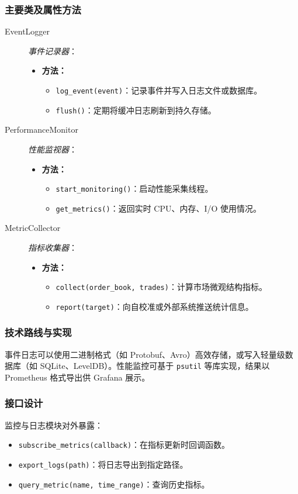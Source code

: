 \subsubsection{主要类及属性方法}
\begin{description}
  \item[EventLogger] \emph{事件记录器}：
  \begin{itemize}
    \item \textbf{方法：}
      \begin{itemize}
        \item \verb|log_event(event)|：记录事件并写入日志文件或数据库。
        \item \verb|flush()|：定期将缓冲日志刷新到持久存储。
      \end{itemize}
  \end{itemize}
  \item[PerformanceMonitor] \emph{性能监视器}：
  \begin{itemize}
    \item \textbf{方法：}
      \begin{itemize}
        \item \verb|start_monitoring()|：启动性能采集线程。
        \item \verb|get_metrics()|：返回实时 CPU、内存、I/O 使用情况。
      \end{itemize}
  \end{itemize}
  \item[MetricCollector] \emph{指标收集器}：
  \begin{itemize}
    \item \textbf{方法：}
      \begin{itemize}
        \item \verb|collect(order_book, trades)|：计算市场微观结构指标。
        \item \verb|report(target)|：向自校准或外部系统推送统计信息。
      \end{itemize}
  \end{itemize}
\end{description}

\subsubsection{技术路线与实现}
事件日志可以使用二进制格式（如 Protobuf、Avro）高效存储，或写入轻量级数据库（如 SQLite、LevelDB）。性能监控可基于 \verb|psutil| 等库实现，结果以 Prometheus 格式导出供 Grafana 展示。

\subsubsection{接口设计}
监控与日志模块对外暴露：
\begin{itemize}
  \item \verb|subscribe_metrics(callback)|：在指标更新时回调函数。
  \item \verb|export_logs(path)|：将日志导出到指定路径。
  \item \verb|query_metric(name, time_range)|：查询历史指标。
\end{itemize}

